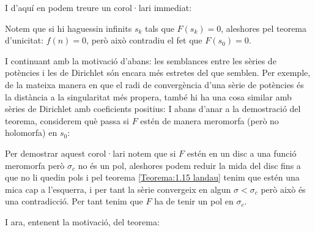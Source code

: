 I d'aquí en podem treure un corol·lari immediat:
\begin{pf}
    Notem que si hi haguessin infinits $s_k$ tals que $F(s_k)=0$, aleshores pel teorema d'unicitat: $f(n)=0$, però això contradiu el fet que $F(s_0)=0$.
\end{pf}
I continuant amb la motivació d'abans: les semblances entre les sèries de potències i les de Dirichlet són encara més estretes del que semblen. Per exemple, de la mateixa manera en que el radi de convergència d'una sèrie de potències és la distància a la singularitat més propera, també hi ha una cosa similar amb sèries de Dirichlet amb coeficients positius:
I abans d'anar a la demostració del teorema, considerem què passa si $F$ estén de manera meromorfa (però no holomorfa) en $s_0$:
\begin{pf}
    Per demostrar aquest corol·lari notem que si $F$ estén en un disc a una funció meromorfa però $\sigma_c$ no és un pol, aleshores podem reduir la mida del disc fins a que no li quedin pols i pel teorema \ref{Teorema:1.15 landau} tenim que estén una mica cap a l'esquerra, i per tant la sèrie convergeix en algun $\sigma<\sigma_c$ però això és una contradicció. Per tant tenim que $F$ ha de tenir un pol en $\sigma_c$.
\end{pf}
I ara, entenent la motivació, del teorema:\\

